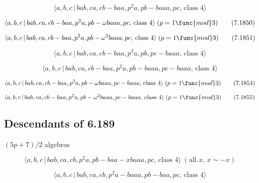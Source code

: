 \documentclass[10pt]{article}
\begin{document}
\begin{equation}
\langle a,b,c\,|\,bab,ca,cb-baa,p^2a,pb-baaa,pc,\,\text{class }4\rangle 
\tag{7.1849}
\end{equation}

\begin{equation}
\langle a,b,c\,|\,bab,ca,cb-baa,p^{2}a,pb-\omega baaa,pc,\,\text{class }%
4\rangle \;(p=1\func{mod}3)  \tag{7.1850}
\end{equation}

\begin{equation}
\langle a,b,c\,|\,bab,ca,cb-baa,p^{2}a,pb-\omega ^{2}baaa,pc,\,\text{class }%
4\rangle \;(p=1\func{mod}3)  \tag{7.1851}
\end{equation}

\begin{equation}
\langle a,b,c\,|\,bab,ca,cb-baa,p^2a,pb,pc-baaa,\,\text{class }4\rangle 
\tag{7.1852}
\end{equation}

\begin{equation}
\langle a,b,c\,|\,bab,ca,cb-baa,p^2a,pb-baaa,pc-baaa,\,\text{class }4\rangle
\tag{7.1853}
\end{equation}

\begin{equation}
\langle a,b,c\,|\,bab,ca,cb-baa,p^{2}a,pb-\omega baaa,pc-baaa,\,\text{class }%
4\rangle \;(p=1\func{mod}3)  \tag{7.1854}
\end{equation}

\begin{equation}
\langle a,b,c\,|\,bab,ca,cb-baa,p^{2}a,pb-\omega ^{2}baaa,pc-baaa,\,\text{%
class }4\rangle \;(p=1\func{mod}3)  \tag{7.1855}
\end{equation}

\subsection{Descendants of 6.189}

$(5p+7)/2$ algebras

\begin{equation}
\langle a,b,c\,|\,bab,ca,cb,p^{2}a,pb-baa-xbaaa,pc,\,\text{class }4\rangle
\;(\text{all }x,\,x\sim -x)  \tag{7.1856}
\end{equation}

\begin{equation}
\langle a,b,c\,|\,bab,ca,cb,p^2a-baaa,pb-baa,pc,\,\text{class }4\rangle 
\tag{7.1857}
\end{equation}
\end{document}
